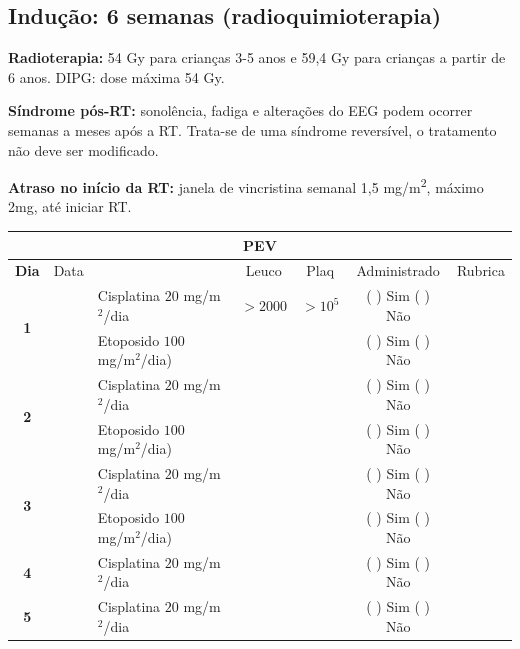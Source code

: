 \documentclass[11pt,a4paper,oldfontcommands]{memoir}
\begin{document}
\subsection{Indução: 6 semanas (radioquimioterapia)}
\textbf{Radioterapia:} 54 Gy para crianças 3-5 anos e 59,4 Gy para crianças a partir de 6 anos. DIPG: dose máxima 54 Gy.

\textbf{Síndrome pós-RT:} sonolência, fadiga e alterações do EEG podem ocorrer semanas a meses após a RT. Trata-se de uma síndrome reversível, o tratamento não deve ser modificado.

\textbf{Atraso no início da RT:} janela de vincristina semanal 1,5 mg/m\textsuperscript{2}, máximo 2mg, até iniciar RT.

\renewcommand{\arraystretch}{1.5}

\begin{center}
\begin{longtable}{p{1cm}c|p{4cm}|p{2cm}p{2cm}|c|c}
	\hline
	\multicolumn{7}{c}{PEV} \\
	\hline
	\multicolumn{1}{c|}{\multirow{1}{*}{\textbf{Dia}}}&{Data}&{}&\multicolumn{1}{c|}{Leuco}&\multicolumn{1}{c|}{Plaq}&{Administrado}&{Rubrica} \\
    \hline
    \multicolumn{1}{c|}{\multirow{2}{*}{\textbf{1}}}&\multirow{2}{*}{}&{Cisplatina \(20\) mg/m\(^2\)/dia}&\multicolumn{1}{c|}{\(>2000\)}&\multicolumn{1}{c|}{\(>10^5\)}&{(  ) Sim (  ) Não}&\\
    \cline{4-5}
    \multicolumn{1}{c|}{}&&{Etoposido \(100\) mg/m\(^2\)/dia)}&\multicolumn{1}{c|}{}&&{(  ) Sim (  ) Não}&\\
    \cline{2-6}
    \multicolumn{1}{c|}{\multirow{2}{*}{\textbf{2}}}&\multirow{2}{*}{}&{Cisplatina \(20\) mg/m\(^2\)/dia}&{}&&{(  ) Sim (  ) Não}&\\
    \multicolumn{1}{c|}{}&&{Etoposido \(100\) mg/m\(^2\)/dia)}&&&{(  ) Sim (  ) Não}&\\
    \cline{2-3}\cline{6-6}
    \multicolumn{1}{c|}{\multirow{2}{*}{\textbf{3}}}&\multirow{2}{*}{}&{Cisplatina \(20\) mg/m\(^2\)/dia}&{}&&{(  ) Sim (  ) Não}&\\
    \multicolumn{1}{c|}{}&&{Etoposido \(100\) mg/m\(^2\)/dia)}&&&{(  ) Sim (  ) Não}&\\
    \cline{2-3}\cline{6-6}
    \multicolumn{1}{c|}{\multirow{1}{*}{{\textbf{4}}}}&{}&{Cisplatina \(20\) mg/m\(^2\)/dia}&{}&&{(  ) Sim (  ) Não}&\\
    \cline{2-3}\cline{6-6}
    \multicolumn{1}{c|}{\multirow{2}{*}{\textbf{5}}}&\multirow{2}{*}{}&{Cisplatina \(20\) mg/m\(^2\)/dia}&{}&&{(  ) Sim (  ) Não}&\\

\end{longtable}
\end{center}
\end{document}
